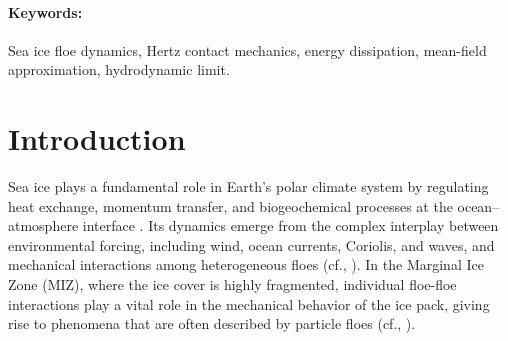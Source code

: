 \documentclass[a4paper,11pt]{article}
\numberwithin{equation}{section}
\theoremstyle{definition}
\begin{document}
\begin{abstract}
This paper builds on the multiscale modeling framework introduced in Part I (Deng and Ha, \textit{Physica D: Nonlinear Phenomena 483 (2025) 134951}) for sea-ice floe dynamics with non-rotating floes to the case with rotational floes, nonlinear contact interactions, Coriolis force and ocean tilt. Building on the particle–kinetic–hydrodynamic hierarchy developed for non-rotating floes, we generalize the particle model to describe ice floes as rigid bodies characterized by position, linear velocity, angular velocity, size, and moment of inertia. The interaction rules now include nonlinear contact forces and torques arising from short-range compression, restitution, and tangential friction laws, together with both oceanic and atmospheric drags that couple translational and rotational motions. These particle descriptions lead to an enriched Vlasov-type kinetic equation posed on an extended phase space, whose moments yield a hydrodynamic system for mass, momentum, and angular-momentum balances. Compared with Part I, the resulting macroscopic equations feature additional hydrodynamic and stress contributions, rotational transport, and dissipative mechanisms stemming from nonlinear collisions. The proposed framework provides a more accurate description of sea-ice floe dynamics and offers a systematic pathway toward multiscale modeling of sea-ice rheology under complex environmental forcing.
%
\end{abstract}
%
%


\paragraph*{Keywords:}
Sea ice floe dynamics, Hertz contact mechanics, energy dissipation, mean-field approximation, hydrodynamic limit.

\section{Introduction} %
Sea ice plays a fundamental role in Earth's polar climate system by regulating heat exchange, momentum transfer, and biogeochemical processes at the ocean--atmosphere interface \cite{lund2020arctic,bennetts2024closing,massom2025influence}. Its dynamics emerge from the complex interplay between environmental forcing, including wind, ocean currents, Coriolis, and waves, and mechanical interactions among heterogeneous floes (cf., \cite{parkinson1979large, feltham2008sea,blockley2020future, hunke2011multiphase, roach2018emergent, meylan2021floe, alberello2020drift, alberello2022three}). In the Marginal Ice Zone (MIZ), where the ice cover is highly fragmented, individual floe-floe interactions play a vital role in the mechanical behavior of the ice pack, giving rise to phenomena that are often described by particle floes (cf., \cite{bennetts2022marginal,bennetts2022theory}).
\end{document}
